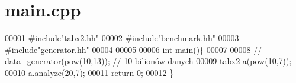\hypertarget{main_8cpp_source}{}\section{main.\+cpp}
\label{main_8cpp_source}

\begin{DoxyCode}
00001 \textcolor{preprocessor}{#include"\hyperlink{tabx2_8hh}{tabx2.hh}"}
00002 \textcolor{preprocessor}{#include"\hyperlink{benchmark_8hh}{benchmark.hh}"}
00003 \textcolor{preprocessor}{#include"\hyperlink{generator_8hh}{generator.hh}"}
00004 
00005 
\hypertarget{main_8cpp_source_l00006}{}\hyperlink{main_8cpp_ae66f6b31b5ad750f1fe042a706a4e3d4}{00006} \textcolor{keywordtype}{int} \hyperlink{main_8cpp_ae66f6b31b5ad750f1fe042a706a4e3d4}{main}()\{
00007   
00008   \textcolor{comment}{// data\_generator(pow(10,13)); // 10 bilionów danych}
00009   \hyperlink{classtabx2}{tabx2} a(pow(10,7));
00010   a.\hyperlink{classbenchmark_a23e508cd746c10ba8a650965673aa839}{analyze}(20,7);  
00011   \textcolor{keywordflow}{return} 0;
00012 \}
\end{DoxyCode}
